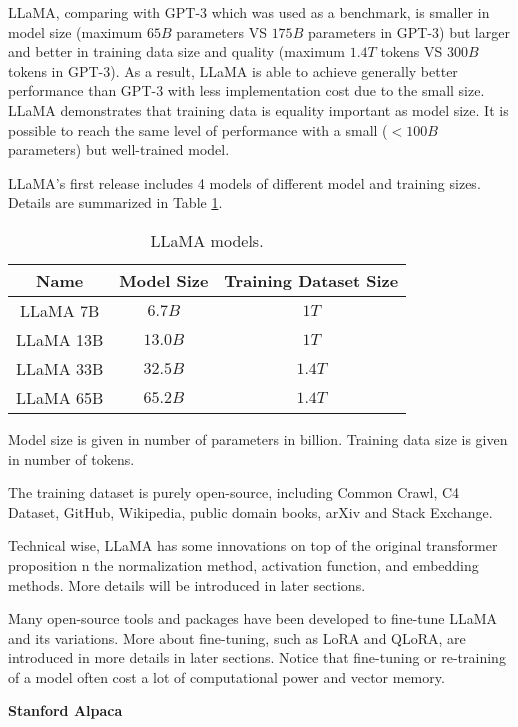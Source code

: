 LLaMA, comparing with GPT-3 which was used as a benchmark, is smaller in model size (maximum $65B$ parameters VS $175B$ parameters in GPT-3) but larger and better in training data size and quality (maximum $1.4T$ tokens VS $300B$ tokens in GPT-3). As a result, LLaMA is able to achieve generally better performance than GPT-3 with less implementation cost due to the small size. LLaMA demonstrates that training data is equality important as model size. It is possible to reach the same level of performance with a small ($<100B$ parameters) but well-trained model.

LLaMA's first release includes 4 models of different model and training sizes. Details are summarized in Table \ref{ch:llm:tab:llamamodels}.
\begin{table}
	\centering \caption{LLaMA models.}\label{ch:llm:tab:llamamodels}
	\begin{tabular}{ccc}
		\hline
		Name & Model Size & Training Dataset Size \\ \hline
		LLaMA 7B & $6.7B$ & $1T$ \\
		LLaMA 13B & $13.0B$ & $1T$ \\
		LLaMA 33B & $32.5B$ & $1.4T$ \\
		LLaMA 65B & $65.2B$ & $1.4T$ \\
		\hline
	\end{tabular}
	\begin{flushleft}
		\footnotesize
		Model size is given in number of parameters in billion. Training data size is given in number of tokens.
	\end{flushleft}
\end{table}
The training dataset is purely open-source, including Common Crawl, C4 Dataset, GitHub, Wikipedia, public domain books, arXiv and Stack Exchange.

Technical wise, LLaMA has some innovations on top of the original transformer proposition \cite{vaswani2017attention} n the normalization method, activation function, and embedding methods. More details will be introduced in later sections.

Many open-source tools and packages have been developed to fine-tune LLaMA and its variations. More about fine-tuning, such as LoRA\cite{hu2021lora} and QLoRA\cite{dettmers2023qlora}, are introduced in more details in later sections. Notice that fine-tuning or re-training of a model often cost a lot of computational power and vector memory.

\vspace{0.1in}
\noindent \textbf{Stanford Alpaca}
\vspace{0.1in}

